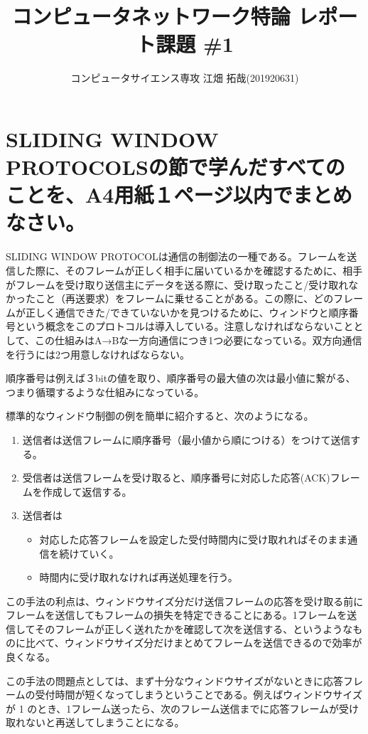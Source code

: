 \documentclass[a4paper, dvipdfmx, 10pt]{article}
\author{コンピュータサイエンス専攻 江畑 拓哉(201920631)}
\date{}
\title{コンピュータネットワーク特論 レポート課題 \#1}
\begin{document}
\maketitle
\section{SLIDING WINDOW PROTOCOLSの節で学んだすべてのことを、A4用紙１ページ以内でまとめなさい。}
\label{sec:org3df3876}
SLIDING WINDOW PROTOCOLは通信の制御法の一種である。フレームを送信した際に、そのフレームが正しく相手に届いているかを確認するために、相手がフレームを受け取り送信主にデータを送る際に、受け取ったこと/受け取れなかったこと（再送要求）をフレームに乗せることがある。この際に、どのフレームが正しく通信できた/できていないかを見つけるために、ウィンドウと順序番号という概念をこのプロトコルは導入している。注意しなければならないこととして、この仕組みはA→Bな一方向通信につき1つ必要になっている。双方向通信を行うには2つ用意しなければならない。\par
順序番号は例えば３bitの値を取り、順序番号の最大値の次は最小値に繋がる、つまり循環するような仕組みになっている。\par
標準的なウィンドウ制御の例を簡単に紹介すると、次のようになる。\par
\begin{enumerate}
\item 送信者は送信フレームに順序番号（最小値から順につける）をつけて送信する。
\item 受信者は送信フレームを受け取ると、順序番号に対応した応答(ACK)フレームを作成して返信する。
\item 送信者は
\begin{itemize}
\item 対応した応答フレームを設定した受付時間内に受け取れればそのまま通信を続けていく。
\item 時間内に受け取れなければ再送処理を行う。
\end{itemize}
\end{enumerate}\par
この手法の利点は、ウィンドウサイズ分だけ送信フレームの応答を受け取る前にフレームを送信してもフレームの損失を特定できることにある。1フレームを送信してそのフレームが正しく送れたかを確認して次を送信する、というようなものに比べて、ウィンドウサイズ分だけまとめてフレームを送信できるので効率が良くなる。\par
この手法の問題点としては、まず十分なウィンドウサイズがないときに応答フレームの受付時間が短くなってしまうということである。例えばウィンドウサイズが 1 のとき、1フレーム送ったら、次のフレーム送信までに応答フレームが受け取れないと再送してしまうことになる。\par
\end{document}
